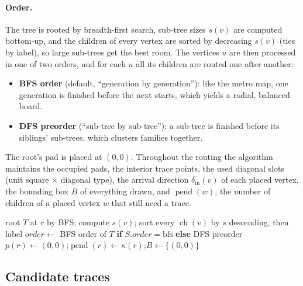 \documentclass[11pt,a4paper]{article}
\theoremstyle{remark}
\newcommand{\pos}{p}
\newcommand{\pend}{\operatorname{pend}}
\begin{document}
\paragraph{Order.} The tree is rooted by breadth-first search, sub-tree sizes $s(v)$ are computed bottom-up, and the
children of every vertex are sorted by decreasing $s(v)$ (ties by label), so large sub-trees get the best room. The
vertices $u$ are then processed in one of two orders, and for each $u$ all its children are routed one after
another:
\begin{itemize}[nosep]
  \item \textbf{BFS order} (default, ``generation by generation''): like the metro map, one generation is finished
        before the next starts, which yields a radial, balanced board.
  \item \textbf{DFS preorder} (``sub-tree by sub-tree''): a sub-tree is finished before its siblings' sub-trees,
        which clusters families together.
\end{itemize}
The root's pad is placed at $(0,0)$. Throughout the routing the algorithm maintains the occupied pads, the interior
trace points, the used diagonal slots (unit square $\times$ diagonal type), the arrival direction
$\delta_{\mathrm{in}}(v)$ of each placed vertex, the bounding box $B$ of everything drawn, and
$\pend(w)$, the number of children of a placed vertex $w$ that still need a trace.

\begin{algorithm}[t]
\caption{\textsc{LayoutTree}$(T, r, S)$ --- greedy routing of one tree}\label{alg:tree}
\DontPrintSemicolon
root $T$ at $r$ by BFS; compute $s(v)$; sort every $\operatorname{ch}(v)$ by $s$ descending, then label\;
$\mathit{order}\gets$ BFS order of $T$ \textbf{if} $S.\mathit{order}=\text{bfs}$ \textbf{else} DFS preorder\;
$\pos(r)\gets(0,0)$;\quad $\pend(r)\gets\kappa(r)$;\quad $B\gets\{(0,0)\}$\;
\end{algorithm}

\subsection{Candidate traces}\label{sec:candidates}
\end{document}
